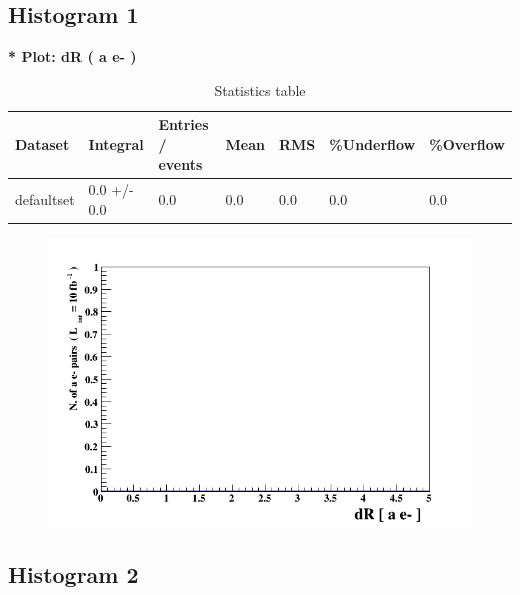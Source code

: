\documentclass[a4paper, 11pt]{article}
\begin{document}
\subsection{ Histogram 1}

   \textbf{   * Plot: dR ( a e- ) }
\textbf{ }\begin{table}[!h]
  \begin{center}
    \caption{ Statistics table}
    \begin{tabular}{|m{17.0mm}|m{27.0mm}|m{23.0mm}|m{18.0mm}|m{18.0mm}|m{14.0mm}|m{14.0mm}|}
      \hline
      \cellcolor{yellow}         Dataset& \cellcolor{yellow}         Integral& \cellcolor{yellow}         Entries /\- events& \cellcolor{yellow}         Mean& \cellcolor{yellow}         RMS& \cellcolor{yellow}         \%Underflow& \cellcolor{yellow}         \%Overflow\\
      \hline
      \cellcolor{white}         defaultset& \cellcolor{white}         0.0 +/\-- 0.0& \cellcolor{white}         0.0& \cellcolor{white}         0.0& \cellcolor{white}         0.0& \cellcolor{green}         0.0& \cellcolor{green}         0.0\\
\hline
    \end{tabular}
  \end{center}
\end{table}

\begin{figure}[!h]
  \begin{center}
    \includegraphics[scale=0.6]{selection_0.png}\\
\caption{}
  \end{center}
\end{figure}
\newpage
   \newpage
\subsection{ Histogram 2}
\end{document}
